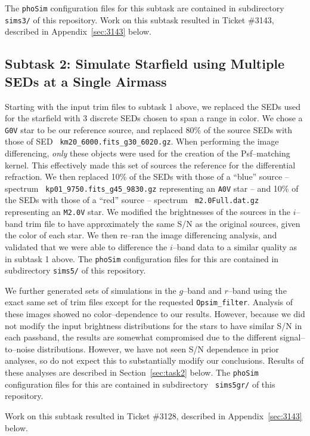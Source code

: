 \documentclass[prd, nofootinbib, floatfix, 11pt, tightenlines, times]{article}
\begin{document}
The {\tt phoSim} configuration files for this subtask are contained in
subdirectory {\tt sims3/} of this repository.  Work on this subtask
resulted in Ticket \#3143, described in Appendix~\ref{sec:3143} below.

\subsection{Subtask 2: Simulate Starfield using Multiple SEDs at a Single Airmass}

Starting with the input trim files to subtask 1 above, we replaced the
SEDs used for the starfield with 3 discrete SEDs chosen to span a
range in color.  We chose a {\tt G0V} star to be our reference source,
and replaced 80\% of the source SEDs with those of SED {\tt
  km20\_6000.fits\_g30\_6020.gz}.  When performing the image
differencing, {\it only} these objects were used for the creation of
the Psf--matching kernel.  This effectively made this set of sources
the reference for the differential refraction.  We then replaced 10\%
of the SEDs with those of a ``blue'' source -- spectrum {\tt
  kp01\_9750.fits\_g45\_9830.gz} representing an {\tt A0V} star -- and
10\% of the SEDs with those of a ``red'' source -- spectrum {\tt
  m2.0Full.dat.gz} representing an {\tt M2.0V} star.  We modified the
brightnesses of the sources in the $i$--band trim file to have
approximately the same S/N as the original sources, given the color of
each star.  We then re--ran the image differencing analysis, and
validated that we were able to difference the $i$--band data to a
similar quality as in subtask 1 above.  The {\tt phoSim} configuration
files for this are contained in subdirectory {\tt sims5/} of this
repository.

We further generated sets of simulations in the $g$--band and
$r$--band using the exact same set of trim files except for the
requested {\tt Opsim\_filter}.  Analysis of these images showed no
color--dependence to our results.  However, because we did not modify
the input brightness distributions for the stars to have similar S/N
in each passband, the results are somewhat compromised due to the
different signal--to--noise distributions.  However, we have not seen
S/N dependence in prior analyses, so do not expect this to
substantially modify our conclusions.  Results of these analyses are
described in Section~\ref{sec:task2} below.  The {\tt phoSim}
configuration files for this are contained in subdirectory {\tt
  sims5gr/} of this repository.

Work on this subtask resulted in Ticket \#3128, described in
Appendix~\ref{sec:3143} below.
\end{document}

